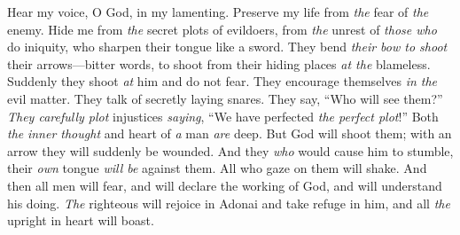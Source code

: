 \begin{biblechapter} %
 Hear my voice, O God, in my lamenting. 
Preserve my life from \textit{the} fear of \textit{the} enemy.
\verse Hide me from \textit{the} secret plots of evildoers, 
from \textit{the} unrest of \textit{those who} do iniquity,
\verse who sharpen their tongue like a sword. 
They bend \textit{their bow to shoot} their arrows—bitter words,
\verse to shoot from their hiding places \textit{at the} blameless. 
Suddenly they shoot \textit{at} him and do not fear.
\verse They encourage themselves \textit{in the} evil matter. 
They talk of secretly laying snares. 
They say, “Who will see them?”
\verse \textit{They carefully plot} injustices \textit{saying}, 
“We have perfected \textit{the perfect plot}!” 
Both \textit{the} \textit{inner thought} and heart of \textit{a} man \textit{are} deep.
\verse But God will shoot them; 
with an arrow they will suddenly be wounded.
\verse  And they \textit{who} would cause him to stumble, 
their \textit{own} tongue \textit{will be} against them. 
All who gaze on them will shake.
\verse And then all men will fear, 
and will declare the working of God, 
and will understand his doing.
\verse \textit{The} righteous will rejoice in Adonai and take refuge in him, 
and all \textit{the} upright in heart will boast.
\end{biblechapter}

